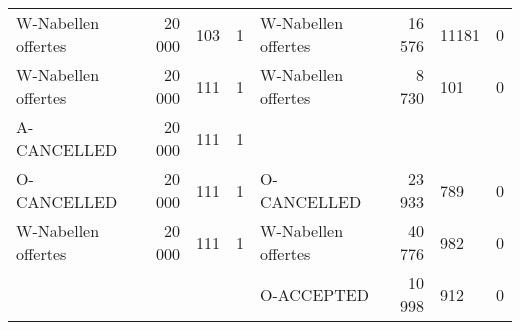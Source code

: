 \begin{table}
\begin{tabular}{lrlrlrlr}
W-Nabellen offertes & 20 000 & 103 & 1 & W-Nabellen offertes & 16 576 & 11181 & 0 \\
W-Nabellen offertes & 20 000 & 111 & 1 & W-Nabellen offertes & 8 730 & 101 & 0 \\
A-CANCELLED & 20 000 & 111 & 1 &  &  &  &  \\
O-CANCELLED & 20 000 & 111 & 1 & O-CANCELLED & 23 933 & 789 & 0 \\
W-Nabellen offertes & 20 000 & 111 & 1 & W-Nabellen offertes & 40 776 & 982 & 0 \\
 &  &  &  & O-ACCEPTED & 10 998 & 912 & 0 \\
\bottomrule
\end{tabular}
\end{table}
